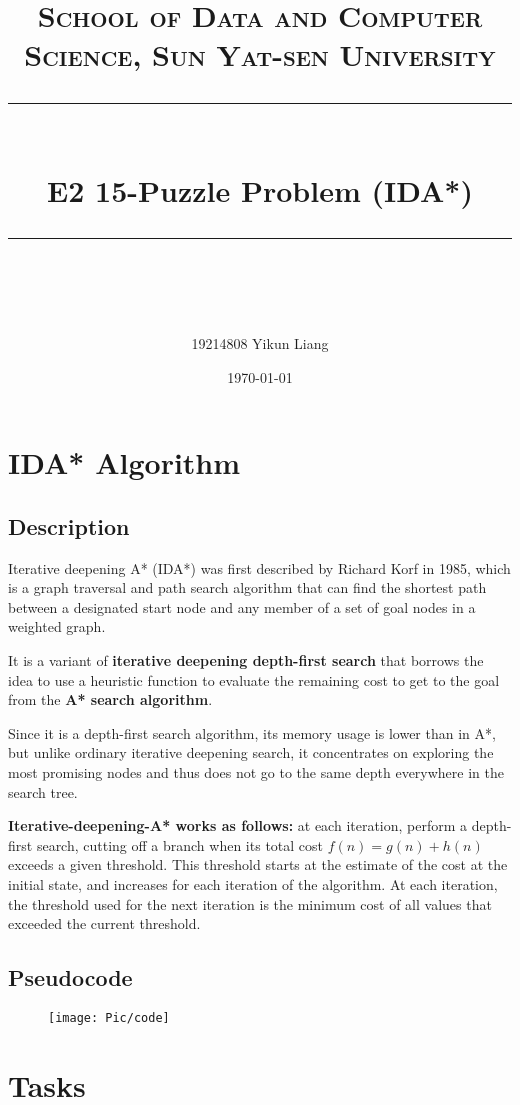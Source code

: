 \documentclass[a4paper, 11pt]{article}
\title{	
\normalfont \normalsize
\textsc{School of Data and Computer Science, Sun Yat-sen University} \\ [25pt] %
\rule{\textwidth}{0.5pt} \\[0.4cm] %
\huge  E2 15-Puzzle Problem (IDA*)\\ %
\rule{\textwidth}{2pt} \\[0.5cm] %
\author{19214808 Yikun Liang}
\date{\normalsize\today}
}
\begin{document}
\maketitle
\tableofcontents
\newpage

\section{IDA* Algorithm}
\subsection{Description}
Iterative deepening A* (IDA*) was first described by Richard Korf in 1985, which is a graph traversal and path search algorithm that can find the shortest path between a designated start node and any member of a set of goal nodes in a weighted graph. 

It is a variant of \textbf{iterative deepening depth-first search} that borrows the idea to use a heuristic function to evaluate the remaining cost to get to the goal from the \textbf{A* search algorithm}. 

Since it is a depth-first search algorithm, its memory usage is lower than in A*, but unlike ordinary iterative deepening search, it concentrates on exploring the most promising nodes and thus does not go to the same depth everywhere in the search tree. 

\textbf{Iterative-deepening-A* works as follows:} at each iteration, perform a depth-first search, cutting off a branch when its total cost $f(n)=g(n)+h(n)$ exceeds a given threshold. This threshold starts at the estimate of the cost at the initial state, and increases for each iteration of the algorithm. At each iteration, the threshold used for the next iteration is the minimum cost of all values that exceeded the current threshold.
\subsection{Pseudocode}
\begin{figure}[ht]
\centering
\texttt{[image: Pic/code]}
\end{figure}
\section{Tasks}
\end{document}
